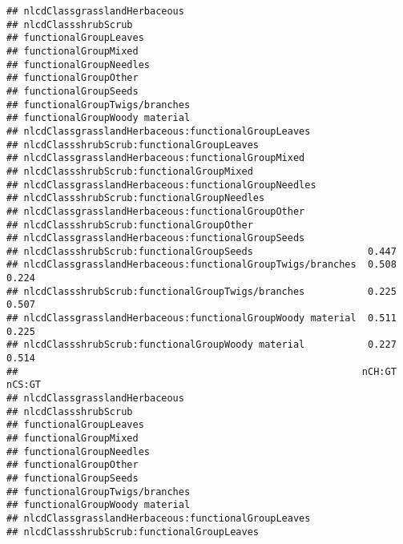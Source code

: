 \documentclass[]{article}
\begin{document}
\begin{verbatim}
## nlcdClassgrasslandHerbaceous                                            
## nlcdClassshrubScrub                                                     
## functionalGroupLeaves                                                   
## functionalGroupMixed                                                    
## functionalGroupNeedles                                                  
## functionalGroupOther                                                    
## functionalGroupSeeds                                                    
## functionalGroupTwigs/branches                                           
## functionalGroupWoody material                                           
## nlcdClassgrasslandHerbaceous:functionalGroupLeaves                      
## nlcdClassshrubScrub:functionalGroupLeaves                               
## nlcdClassgrasslandHerbaceous:functionalGroupMixed                       
## nlcdClassshrubScrub:functionalGroupMixed                                
## nlcdClassgrasslandHerbaceous:functionalGroupNeedles                     
## nlcdClassshrubScrub:functionalGroupNeedles                              
## nlcdClassgrasslandHerbaceous:functionalGroupOther                       
## nlcdClassshrubScrub:functionalGroupOther                                
## nlcdClassgrasslandHerbaceous:functionalGroupSeeds                       
## nlcdClassshrubScrub:functionalGroupSeeds                    0.447       
## nlcdClassgrasslandHerbaceous:functionalGroupTwigs/branches  0.508  0.224
## nlcdClassshrubScrub:functionalGroupTwigs/branches           0.225  0.507
## nlcdClassgrasslandHerbaceous:functionalGroupWoody material  0.511  0.225
## nlcdClassshrubScrub:functionalGroupWoody material           0.227  0.514
##                                                            nCH:GT nCS:GT
## nlcdClassgrasslandHerbaceous                                            
## nlcdClassshrubScrub                                                     
## functionalGroupLeaves                                                   
## functionalGroupMixed                                                    
## functionalGroupNeedles                                                  
## functionalGroupOther                                                    
## functionalGroupSeeds                                                    
## functionalGroupTwigs/branches                                           
## functionalGroupWoody material                                           
## nlcdClassgrasslandHerbaceous:functionalGroupLeaves                      
## nlcdClassshrubScrub:functionalGroupLeaves                               

\end{verbatim}
\end{document}
